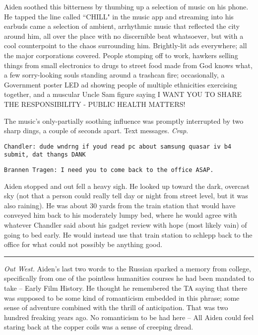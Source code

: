 \documentclass[11pt]{book}
\begin{document}
	Aiden soothed this bitterness by thumbing up a selection of music on his phone. He tapped the line called ``CHILL" in the music app and streaming into his earbuds came a selection of ambient, arrhythmic music that reflected the city around him, all over the place with no discernible beat whatsoever, but with a cool counterpoint to the chaos surrounding him. Brightly-lit ads everywhere; all the major corporations covered. People stomping off to work, hawkers selling things from small electronics to drugs to street food made from God knows what, a few sorry-looking souls standing around a trashcan fire; occasionally, a Government poster LED ad showing people of multiple ethnicities exercising together, and a muscular Uncle Sam figure saying I WANT YOU TO SHARE THE RESPONSIBILITY - PUBLIC HEALTH MATTERS! 
	
	The music's only-partially soothing influence was promptly interrupted by two sharp dings, a couple of seconds apart. Text messages. \textit{Crap}.
	
	\vspace{0.5cm}
	
	\texttt{Chandler: dude wndrng if youd read pc about samsung quasar iv b4 submit, dat thangs DANK} 
	
	\texttt{Brannen Tragen: I need you to come back to the office ASAP.}
	
	\vspace{0.5cm}
	
	Aiden stopped and out fell a heavy sigh. He looked up toward the dark, overcast sky (not that a person could really tell day or night from street level, but it was also raining). He was about 30 yards from the train station that would have conveyed him back to his moderately lumpy bed, where he would agree with whatever Chandler said about his gadget review with hope (most likely vain) of going to bed early. He would instead use that train station to schlepp back to the office for what could not possibly be anything good.
	
	\vspace{0.5cm}
	\hrule
	\vspace{0.5cm}
	
	\textit{Out West.} Aiden's last two words to the Russian sparked a memory from college, specifically from one of the pointless humanities courses he had been mandated to take -- Early Film History. He thought he remembered the TA saying that there was supposed to be some kind of romanticism embedded in this phrase; some sense of adventure combined with the thrill of anticipation. That was two hundred freaking years ago. No romanticism to be had here -- All Aiden could feel staring back at the copper coils was a sense of creeping dread.
	
\end{document}
